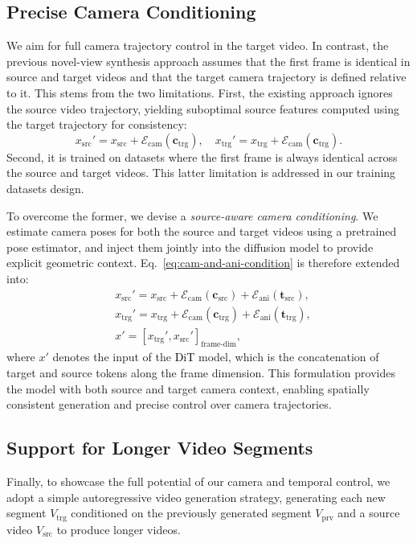 \documentclass[10pt,twocolumn,letterpaper]{article}
\newcommand{\nameCOLOR}[1]{\textcolor{black}{#1}}
\newcommand{\dit}{\nameCOLOR{\mbox{DiT}}\xspace}
\newcommand{\src}{\text{src}}
\newcommand{\trg}{\text{trg}}
\newcommand{\prv}{\text{prv}}
\newcommand{\camera}{\mathbf{c}}
\newcommand{\animatime}{\mathbf{t}}
\newcommand{\camencoder}{\mathcal{E}_\text{cam}}
\newcommand{\animaencoder}{\mathcal{E}_\text{ani}}
\begin{document}


\subsection{Precise Camera Conditioning}
\label{sec:src_cam}
We aim for full camera trajectory control in the target video.
In contrast, the previous novel-view synthesis approach \cite{Bai2025} assumes that the first frame is identical in source and target videos and that the target camera trajectory is defined relative to it. 
This stems from the two limitations. 
First, the existing approach ignores the source video trajectory, yielding suboptimal source features computed using the target trajectory for consistency:
\[
x_\src' = x_\src + \camencoder\left(\camera_\trg\right), \quad x_\trg' = x_\trg+ \camencoder\left(\camera_\trg\right).
\]
Second, it is trained on datasets where the first frame is always identical across the source and target videos. 
This latter limitation is addressed in our training datasets design.

To overcome the former, we devise a \textit{source-aware camera conditioning}. 
We estimate camera poses for both the source and target videos using a pretrained pose estimator, and inject them jointly into the diffusion model to provide explicit geometric context. Eq.~\ref{eq:cam-and-ani-condition} is therefore extended into:
\begin{align}
&x_\src' = x_\src + \camencoder\left(\camera_\src\right) + \animaencoder\left(\animatime_\src\right), \label{eq-srccam} \\
&x_\trg' = x_\trg + \camencoder\left(\camera_\trg\right) + \animaencoder\left(\animatime_\trg\right), \nonumber \\
&x' = [x_\trg', x_\src']_{\text{frame-dim}}, \nonumber
\end{align}
where $x'$ denotes the input of the \dit model, which is the concatenation of target and source tokens along the frame dimension. This formulation provides the model with both source and target camera context, enabling spatially consistent generation and precise control over camera trajectories.







\subsection{Support for Longer Video Segments}
\label{sec:LongerVideoSegements}
Finally, to showcase the full potential of our camera and temporal control, we adopt a simple autoregressive video generation strategy, generating each new segment $V_{\trg}$ conditioned on the previously generated segment $V_{\prv}$ and a source video $V_{\src}$ to produce longer videos. 
\end{document}
